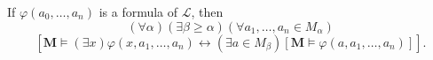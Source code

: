 If $\varphi(a_0, \ldots, a_n)$ is a formula of $\mathcal{L}$, then
$$(\forall \alpha)(\exists \beta \geq \alpha)(\forall a_1, \ldots, a_n \in M_\alpha)$$
$$[\mathbf{M} \models (\exists x) \varphi(x, a_1, \ldots, a_n) \leftrightarrow (\exists a \in M_\beta)[\mathbf{M} \models \varphi(a, a_1, \ldots, a_n)]].$$
